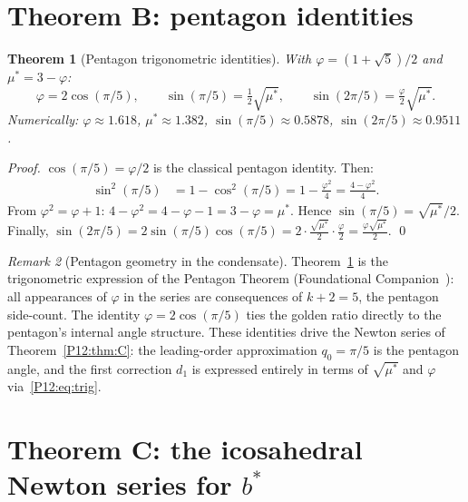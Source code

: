 \documentclass[11pt,a4paper]{article}
\newtheorem{theorem}{Theorem}[section]
\theoremstyle{definition}
\theoremstyle{remark}
\newtheorem{remark}[theorem]{Remark}
\newcommand{\vp}{\varphi}
\newcommand{\ms}{\mu^{*}}
\begin{document}
\section{Theorem B: pentagon identities}
\label{P12:sec:B}

\begin{theorem}[Pentagon trigonometric identities]
\label{P12:thm:B}
With $\vp=(1+\sqrt{5})/2$ and $\ms=3-\vp$:
\begin{equation}
  \boxed{
  \vp = 2\cos(\pi/5),\qquad
  \sin(\pi/5)=\tfrac{1}{2}\sqrt{\ms},\qquad
  \sin(2\pi/5)=\tfrac{\vp}{2}\sqrt{\ms}.
  }
  \label{P12:eq:trig}
\end{equation}
Numerically: $\vp\approx1.618$, $\ms\approx1.382$,
$\sin(\pi/5)\approx0.5878$, $\sin(2\pi/5)\approx0.9511$.
\end{theorem}

\begin{proof}
$\cos(\pi/5)=\vp/2$ is the classical pentagon identity.
Then:
\begin{align}
  \sin^2(\pi/5) &= 1 - \cos^2(\pi/5) = 1 - \frac{\vp^2}{4}
  = \frac{4-\vp^2}{4}.
  \label{P12:eq:sin2_proof}
\end{align}
From $\vp^2=\vp+1$: $4-\vp^2 = 4-\vp-1 = 3-\vp = \ms$.
Hence $\sin(\pi/5)=\sqrt{\ms}/2$.
Finally, $\sin(2\pi/5)=2\sin(\pi/5)\cos(\pi/5)
=2\cdot\frac{\sqrt{\ms}}{2}\cdot\frac{\vp}{2}=\frac{\vp\sqrt{\ms}}{2}$.
\qed
\end{proof}

\begin{remark}[Pentagon geometry in the condensate]
\label{P12:rem:pentagon}
Theorem~\ref{P12:thm:B} is the trigonometric expression of the
Pentagon Theorem (Foundational Companion~\cite{PaperFC}):
all appearances of $\vp$ in the series are consequences of $k+2=5$,
the pentagon side-count.
The identity $\vp=2\cos(\pi/5)$ ties the golden ratio directly to
the pentagon's internal angle structure.
These identities drive the Newton series of Theorem~\ref{P12:thm:C}:
the leading-order approximation $q_0=\pi/5$ is the pentagon angle,
and the first correction $d_1$ is expressed entirely in terms of
$\sqrt{\ms}$ and $\vp$ via~\eqref{P12:eq:trig}.
\end{remark}

\section{Theorem C: the icosahedral Newton series for $b^*$}
\label{P12:sec:C}
\end{document}
